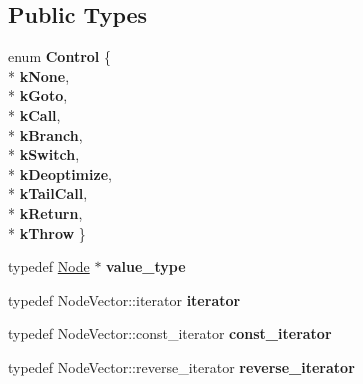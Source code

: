 \subsection*{Public Types}
\begin{DoxyCompactItemize}
\item 
enum {\bfseries Control} \{ \\*
{\bfseries k\+None}, 
\\*
{\bfseries k\+Goto}, 
\\*
{\bfseries k\+Call}, 
\\*
{\bfseries k\+Branch}, 
\\*
{\bfseries k\+Switch}, 
\\*
{\bfseries k\+Deoptimize}, 
\\*
{\bfseries k\+Tail\+Call}, 
\\*
{\bfseries k\+Return}, 
\\*
{\bfseries k\+Throw}
 \}\hypertarget{classv8_1_1internal_1_1compiler_1_1_basic_block_a7162100f0572bd1e40481cb882497a9d}{}\label{classv8_1_1internal_1_1compiler_1_1_basic_block_a7162100f0572bd1e40481cb882497a9d}

\item 
typedef \hyperlink{classv8_1_1internal_1_1compiler_1_1_node}{Node} $\ast$ {\bfseries value\+\_\+type}\hypertarget{classv8_1_1internal_1_1compiler_1_1_basic_block_a9d3bef41c553b850f67ebd791f055fff}{}\label{classv8_1_1internal_1_1compiler_1_1_basic_block_a9d3bef41c553b850f67ebd791f055fff}

\item 
typedef Node\+Vector\+::iterator {\bfseries iterator}\hypertarget{classv8_1_1internal_1_1compiler_1_1_basic_block_aaba0521b1798202fdb1b361e70a5b5cc}{}\label{classv8_1_1internal_1_1compiler_1_1_basic_block_aaba0521b1798202fdb1b361e70a5b5cc}

\item 
typedef Node\+Vector\+::const\+\_\+iterator {\bfseries const\+\_\+iterator}\hypertarget{classv8_1_1internal_1_1compiler_1_1_basic_block_ac048ade40b17747143dfbd16859366ef}{}\label{classv8_1_1internal_1_1compiler_1_1_basic_block_ac048ade40b17747143dfbd16859366ef}

\item 
typedef Node\+Vector\+::reverse\+\_\+iterator {\bfseries reverse\+\_\+iterator}\hypertarget{classv8_1_1internal_1_1compiler_1_1_basic_block_a50b6e483eb6d4c9ccba10a2d354b7c4b}{}\label{classv8_1_1internal_1_1compiler_1_1_basic_block_a50b6e483eb6d4c9ccba10a2d354b7c4b}

\end{DoxyCompactItemize}
